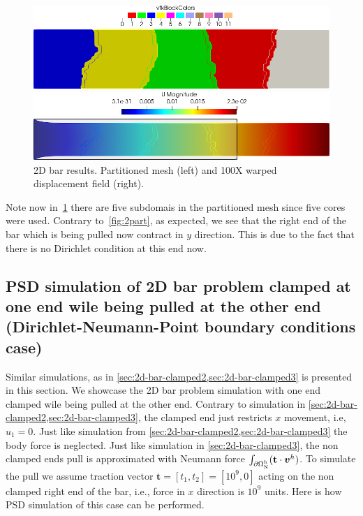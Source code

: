 \documentclass{report}
\newcommand{\bvh}{\boldsymbol v^h}
\begin{document}
\begin{figure}[htbp]
    \centering
    \begin{minipage}[t][2cm][t]{0.36\textwidth}
    \includegraphics[align=b,width=1\textwidth]{./Images/2d-bar-partitioned5.png}
    \end{minipage}\hspace{.1\textwidth}
    \begin{minipage}[t][2cm][t]{0.5\textwidth}
    \includegraphics[align=b,width=1\textwidth]{./Images/2d-bar-clamped-traction.png}
    \end{minipage}
    \caption{2D bar results. Partitioned mesh (left) and 100X warped displacement field (right).}
    \label{fig:5part}
\end{figure}

Note now in~\cref{fig:5part} there are five subdomais in the partitioned mesh since five cores were used. Contrary to~\cref{fig:2part}, as expected, we see that the right end of the bar which is being pulled now contract in $y$ direction. This is due to the fact that there is no Dirichlet condition at this end now. 

\pagebreak




\subsection{PSD simulation of 2D bar problem clamped at one end wile being pulled at the other end (Dirichlet-Neumann-Point boundary conditions case)\label{sec:2d-bar-clamped4}}


Similar simulations, as in \cref{sec:2d-bar-clamped2,sec:2d-bar-clamped3} is presented in this section. We showcase the 2D bar problem simulation with one end clamped  wile being pulled at the other end. Contrary to simulation in \cref{sec:2d-bar-clamped2,sec:2d-bar-clamped3}, the clamped end just restricts $x$ movement, i.e, $u_1=0$. Just like simulation from \cref{sec:2d-bar-clamped2,sec:2d-bar-clamped3} the body force is neglected. Just like simulation in  \cref{sec:2d-bar-clamped3}, the non clamped ends pull is approximated with Neumann force $\int_{\partial\Omega^h_{\text N}}(\mathbf t\cdot \bvh)$. To simulate the pull we assume traction vector $\mathbf t=[t_1,t_2]=[10^9,0]$ acting on the non clamped right end of the bar, i.e., force in $x$ direction is $10^9$ units. Here is how PSD simulation of this case can be performed.
\end{document}
